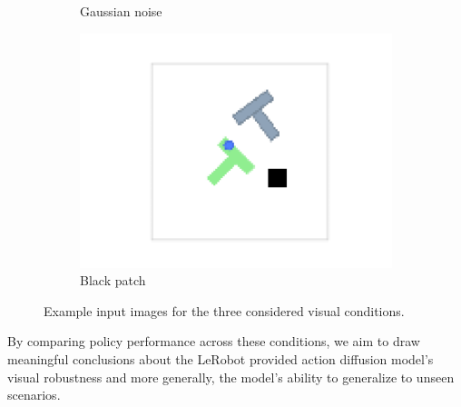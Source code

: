 \begin{figure}[!htb]
\begin{subfigure}[b]{0.3\linewidth}
        \caption{Gaussian noise}
        \label{fig:visual_perturbations_examples_noise}
    \end{subfigure}
    \begin{subfigure}[b]{0.3\linewidth}
        \centering
        \includegraphics[width=\linewidth]{figures/illustration_patch.pdf}
        \caption{Black patch}
        \label{fig:visual_perturbations_examples_patch}
    \end{subfigure}
    \caption{Example input images for the three considered visual conditions.}
    \label{fig:visual_perturbations_examples}
\end{figure}

By comparing policy performance across these conditions, we aim to draw meaningful conclusions about
the LeRobot provided action diffusion model's visual robustness and more generally, the model's ability to
generalize to unseen scenarios.
